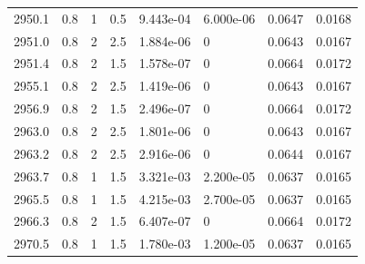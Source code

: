 \documentclass[preview]{standalone}
\begin{document}
{{{{{{{{{\begin{tabular}{L{1.2cm}C{1.2cm} C{0.3cm}C{0.5cm} C{1.4cm}C{1.4cm} C{1.4cm}C{1.4cm}}
  2950.1  &   0.8  & 1     & 0.5 &  9.443e-04  & 6.000e-06  & 0.0647 &  0.0168   \\ 
  2951.0  &   0.8  & 2     & 2.5 &  1.884e-06  & 0  & 0.0643 &  0.0167   \\ 
  2951.4  &   0.8  & 2     & 1.5 &  1.578e-07  & 0  & 0.0664 &  0.0172   \\ 
  2955.1  &   0.8  & 2     & 2.5 &  1.419e-06  & 0  & 0.0643 &  0.0167   \\ 
  2956.9  &   0.8  & 2     & 1.5 &  2.496e-07  & 0  & 0.0664 &  0.0172   \\ 
  2963.0  &   0.8  & 2     & 2.5 &  1.801e-06  & 0  & 0.0643 &  0.0167   \\ 
  2963.2  &   0.8  & 2     & 2.5 &  2.916e-06  & 0  & 0.0644 &  0.0167   \\ 
  2963.7  &   0.8  & 1     & 1.5 &  3.321e-03  & 2.200e-05  & 0.0637 &  0.0165   \\ 
  2965.5  &   0.8  & 1     & 1.5 &  4.215e-03  & 2.700e-05  & 0.0637 &  0.0165   \\ 
  2966.3  &   0.8  & 2     & 1.5 &  6.407e-07  & 0  & 0.0664 &  0.0172   \\ 
  2970.5  &   0.8  & 1     & 1.5 &  1.780e-03  & 1.200e-05  & 0.0637 &  0.0165   \\ 
\hline 
\end{tabular} 

}}}}}}}}}
\end{document}
